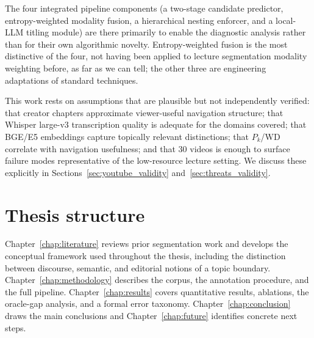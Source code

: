 The four integrated pipeline components (a two-stage candidate predictor,
entropy-weighted modality fusion, a hierarchical nesting enforcer, and a
local-LLM titling module) are there primarily to enable the diagnostic
analysis rather than for their own algorithmic novelty. Entropy-weighted
fusion is the most distinctive of the four, not having been applied to
lecture segmentation modality weighting before, as far as we can tell; the
other three are engineering adaptations of standard techniques.

This work rests on assumptions that are plausible but not independently
verified: that creator chapters approximate viewer-useful navigation structure;
that Whisper large-v3 transcription quality is adequate for the domains
covered; that BGE/E5 embeddings capture topically relevant distinctions; that
$P_k$/WD correlate with navigation usefulness; and that 30 videos is enough
to surface failure modes representative of the low-resource lecture setting.
We discuss these explicitly in
Sections~\ref{sec:youtube_validity} and~\ref{sec:threats_validity}.

\section{Thesis structure}
\label{sec:structure}

Chapter~\ref{chap:literature} reviews prior segmentation work and develops
the conceptual framework used throughout the thesis, including the distinction
between discourse, semantic, and editorial notions of a topic boundary.
Chapter~\ref{chap:methodology} describes the \dataset{} corpus, the annotation
procedure, and the full pipeline.
Chapter~\ref{chap:results} covers quantitative results, ablations, the
oracle-gap analysis, and a formal error taxonomy.
Chapter~\ref{chap:conclusion} draws the main conclusions and
Chapter~\ref{chap:future} identifies concrete next steps.
